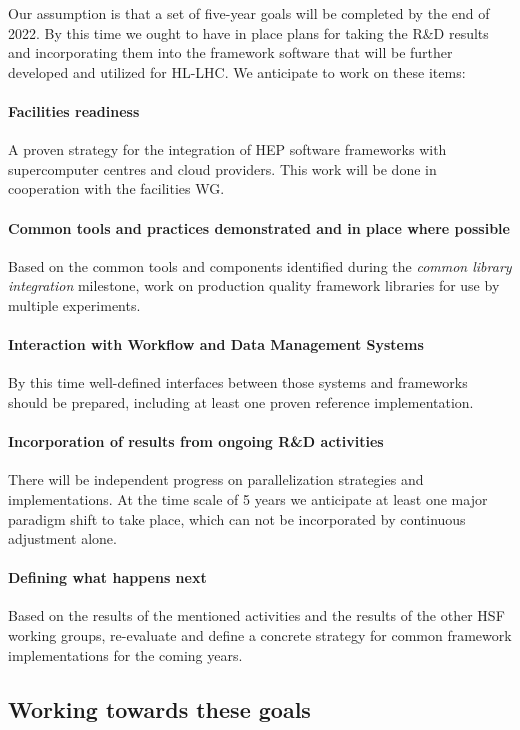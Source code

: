 \documentclass[12pt,a4paper]{article}
\begin{document}
Our assumption is that a set of five-year goals will be completed by
the end of 2022. By this time we ought to have in place plans for
taking the R\&D results and incorporating them into the framework
software that will be further developed and utilized for HL-LHC. We
anticipate to work on these items:

\paragraph{Facilities readiness} A proven strategy for the integration
of HEP software frameworks with supercomputer centres and cloud
providers.  This work will be done in cooperation with the facilities
WG.

\paragraph{Common tools and practices demonstrated and in place where
  possible} Based on the common tools and components identified during
the \emph{common library integration} milestone, work on production
quality framework libraries for use by multiple experiments.

\paragraph{Interaction with Workflow and Data Management Systems} By
this time well-defined interfaces between those systems and frameworks
should be prepared, including at least one proven reference
implementation.

\paragraph{Incorporation of results from ongoing R\&D activities}
There will be independent progress on parallelization strategies and
implementations. At the time scale of 5 years we anticipate at least
one major paradigm shift to take place, which can not be incorporated
by continuous adjustment alone.

\paragraph{Defining what happens next} Based on the results of the
mentioned activities and the results of the other HSF working groups,
re-evaluate and define a concrete strategy for common framework
implementations for the coming years.

\subsection{Working towards these goals}
\label{sec:towards-goals}
\end{document}
